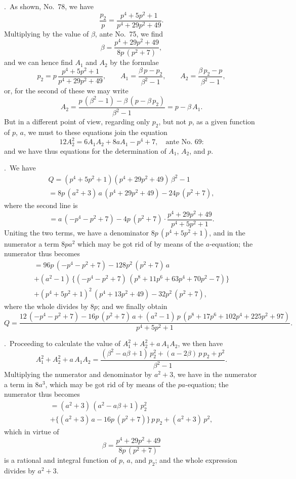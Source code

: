 \documentclass[12pt,a4paper]{article}
\theoremstyle{plain}
\begin{document}
\bigskip{}.\ As shown, No.\ 78, we have
\[
\frac{p_{2}}{p} = \frac{p^{4} + 5p^{2} + 1}{p^{4} + 29p^{2} + 49}.
\]
Multiplying by the value of $\beta$, ante No.\ 75, we find
\[
\beta = \frac{p^{4} + 29p^{2} + 49}{8p\,(p^{2}+7)},
\]
and we can hence find $A_{1}$ and $A_{2}$ by the formulae
\[
p_{2} = p\,\frac{p^{4} + 5p^{2} + 1}{p^{4} + 29p^{2} + 49}, \qquad
A_{1} = \frac{\beta\,p - p_{2}}{\beta^{2}-1}, \qquad
A_{2} = \frac{\beta\,p_{2} - p}{\beta^{2}-1},
\]
or, for the second of these we may write
\[
A_{2} = \frac{p\,(\beta^{2}-1) - \beta\,(p - \beta\,p_{2})}{\beta^{2}-1} = p - \beta\,A_{1}.
\]
But in a different point of view, regarding only $p_{2}$, but not $p$, as a given function of $p$, $a$, we must to these equations join the equation
\[
12A_{2}^{2} = 6A_{1}A_{2} + 8aA_{1} - p^{4} + 7, \quad \text{ante No.\ 69:}
\]
and we have thus equations for the determination of $A_{1}$, $A_{2}$, and $p$.

\bigskip{}.\ We have
\begin{multline*}
Q = (p^{4} + 5p^{2} + 1)(p^{4} + 29p^{2} + 49)\,\beta^{2} - 1 \\
= 8p\,(a^{2}+3)\,a\,(p^{4} + 29p^{2} + 49) - 24p\,(p^{2}+7),
\end{multline*}
where the second line is
\[
= a\,(-p^{4} - p^{2} + 7) - 4p\,(p^{2}+7) \cdot \frac{p^{4} + 29p^{2} + 49}{p^{4} + 5p^{2} + 1}.
\]
Uniting the two terms, we have a denominator $8p\,(p^{4}+5p^{2}+1)$, and in the numerator a term $8pa^{2}$ which may be got rid of by means of the $a$-equation; the numerator thus becomes
\begin{multline*}
= 96p\,(-p^{4} - p^{2} + 7) - 128p^{2}\,(p^{2}+7)\,a \\
+ (a^{2}-1)\,\{(-p^{4}-p^{2}+7)\,(p^{8} + 11p^{6} + 63p^{4} + 70p^{2} - 7)\} \\
+ (p^{4} + 5p^{2} + 1)^{2}\,(p^{4} + 13p^{2} + 49) - 32p^{2}\,(p^{2}+7),
\end{multline*}
where the whole divides by $8p$; and we finally obtain
\[
Q = \frac{12\,(-p^{4} - p^{2} + 7) - 16p\,(p^{2}+7)\,a + (a^{2}-1)\,p\,(p^{8} + 17p^{6} + 102p^{4} + 225p^{2} + 97)}{p^{4} + 5p^{2} + 1}.
\]

\bigskip{}.\ Proceeding to calculate the value of $A_{1}^{2} + A_{2}^{2} + a\,A_{1}A_{2}$, we then have
\[
A_{1}^{2} + A_{2}^{2} + a\,A_{1}A_{2} = \frac{(\beta^{2} - a\beta + 1)\,p_{2}^{2} + (a - 2\beta)\,p\,p_{2} + p^{2}}{\beta^{2} - 1}.
\]
Multiplying the numerator and denominator by $a^{2} + 3$, we have in the numerator a term in $8a^{3}$, which may be got rid of by means of the $pa$-equation; the numerator thus becomes
\begin{multline*}
= (a^{2} + 3)\,(a^{2} - a\beta + 1)\,p_{2}^{2} \\
+ \{(a^{2} + 3)\,a - 16p\,(p^{2}+7)\}\,p\,p_{2} + (a^{2}+3)\,p^{2},
\end{multline*}
which in virtue of
\[
\beta = \frac{p^{4} + 29p^{2} + 49}{8p\,(p^{2}+7)}
\]
is a rational and integral function of $p$, $a$, and $p_{2}$; and the whole expression divides by $a^{2} + 3$.
\end{document}
